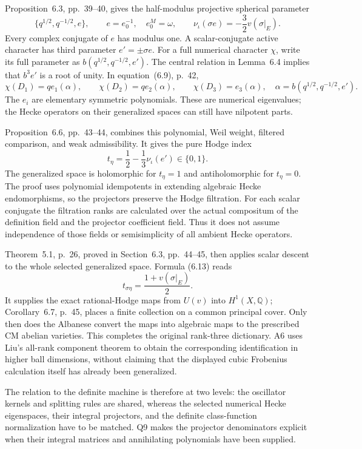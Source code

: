 \documentclass[11pt]{article}
\newcommand{\Q}{\mathbb Q}\newcommand{\C}{\mathbb C}\newcommand{\Z}{\mathbb Z}\newcommand{\R}{\mathbb R}\newcommand{\A}{\mathbb A}\newcommand{\OO}{\mathcal O}
\theoremstyle{definition}\newtheorem{definition}[theorem]{Definition}\newtheorem{remark}[theorem]{Remark}
\begin{document}
Proposition~6.3, pp.~39--40, gives the half-modulus projective
spherical parameter
\[
 \{q^{1/2},q^{-1/2},e\},\qquad
 e=e_0^{-1},\quad e_0^M=\omega,
 \qquad
 \nu_\iota(\sigma e)=-\frac32v(\sigma|_E).
\]
Every complex conjugate of $e$ has modulus one. A scalar-conjugate
active character has third parameter $e'=\pm\sigma e$.
For a full numerical character $\chi$, write its full parameter as
$b(q^{1/2},q^{-1/2},e')$. The central relation in Lemma~6.4
implies that $b^3e'$ is a root of unity. In equation~(6.9), p.~42,
\[
 \chi(D_1)=q e_1(\alpha),\qquad
 \chi(D_2)=q e_2(\alpha),\qquad
 \chi(D_3)=e_3(\alpha),
 \quad\alpha=b(q^{1/2},q^{-1/2},e').
\]
The $e_i$ are elementary symmetric polynomials. These are numerical
eigenvalues; the Hecke operators on their generalized spaces can
still have nilpotent parts.

Proposition~6.6, pp.~43--44, combines this polynomial, Weil weight,
filtered comparison, and weak admissibility. It gives the pure
Hodge index
\[
 t_\eta=\frac12-\frac13\nu_\iota(e')\in\{0,1\}.
\]
The generalized space is holomorphic for $t_\eta=1$ and
antiholomorphic for $t_\eta=0$. The proof uses polynomial
idempotents in extending algebraic Hecke endomorphisms, so the
projectors preserve the Hodge filtration. For each scalar
conjugate the filtration ranks are calculated over the actual
compositum of the definition field and the projector coefficient
field. Thus it does not assume independence of those fields or
semisimplicity of all ambient Hecke operators.

Theorem~5.1, p.~26, proved in Section~6.3, pp.~44--45, then applies
scalar descent to the whole selected generalized space. Formula
(6.13) reads
\[
 t_{\sigma\eta}=\frac{1+v(\sigma|_E)}2.
\]
It supplies the exact rational-Hodge maps from $U(v)$ into
$H^1(X,\Q)$; Corollary~6.7, p.~45, places a finite collection
on a common principal cover. Only then does the Albanese convert
the maps into algebraic maps to the prescribed CM abelian varieties.
This completes the original rank-three dictionary. A6 uses Liu's
all-rank component theorem to obtain the corresponding identification
in higher ball dimensions, without claiming that the displayed
cubic Frobenius calculation itself has already been generalized.

The relation to the definite machine is therefore at two levels:
the oscillator kernels and splitting rules are shared, whereas the
selected numerical Hecke eigenspaces, their integral projectors,
and the definite class-function normalization have to be matched.
Q9 makes the projector denominators explicit when their integral
matrices and annihilating polynomials have been supplied.
\end{document}
